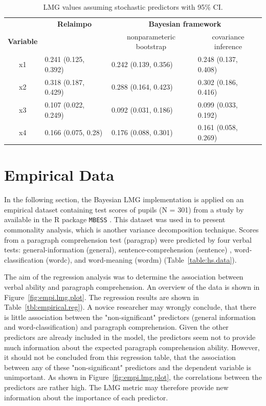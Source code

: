 \documentclass[11pt,a4paper,twoside]{book}
\begin{document}
\begin{table}[h]
\caption{LMG values assuming stochastic predictors with 95\% CI.}
\centering
\begin{tabular}{clll}
   \toprule
  & \multicolumn{1}{c}{\textbf{Relaimpo}} & \multicolumn{2}{c}{\textbf{Bayesian framework}} \\ \cmidrule(r){2-2}\cmidrule(l){3-4}
 \textbf{Variable} &  & \multicolumn{1}{c}{nonparameteric bootstrap}& \multicolumn{1}{c}{covariance inference} \\
 \midrule
x1 & 0.241 (0.125, 0.392)  & 0.242 (0.139, 0.356) &  0.248 (0.137, 0.408) \\ 
x2 & 0.318 (0.187, 0.429)  & 0.288 (0.164, 0.423)  & 0.302 (0.186, 0.416) \\ 
x3 & 0.107 (0.022, 0.249)  & 0.092 (0.031, 0.186)  & 0.099 (0.033, 0.192) \\ 
x4 & 0.166 (0.075, 0.28) & 0.176 (0.088, 0.301) & 0.161 (0.058, 0.269) \\ 
   \bottomrule
\end{tabular}
\label{tbl:nonstochEx1relaimpstoch}
\end{table}







\clearpage

\section{Empirical Data}
In the following section, the Bayesian LMG implementation is applied on an empirical dataset containing test scores of pupils (N = 301) from a study by \cite{Holzinger1939} available in the R package \texttt{MBESS} \citep{MBESS}. This dataset was used in \cite{Nimon2008} to present commonality analysis, which is another variance decomposition technique. Scores from a paragraph comprehension test (paragrap) were predicted by four verbal tests:  general-information (general),  sentence-comprehension (sentence) ,  word-classification (wordc), and  word-meaning (wordm) (Table~\ref{table:hs.data}). 

The aim of the regression analysis was to determine the  association between verbal ability and paragraph comprehension.  
An overview of the data is shown in Figure~\ref{fig:empi.lmg.plot}. The regression results are shown in Table~\ref{tbl:empirical.reg}). A novice researcher may wrongly conclude, that there is little association between the "non-significant" predictors (general information and word-classification) and paragraph comprehension. Given the other predictors are already included in the model, the predictors seem not to provide  much information about the expected paragraph comprehension ability. However, it should not be concluded from this regression table, that the association between any of these "non-significant" predictors and the dependent variable is unimportant. As shown in Figure~\ref{fig:empi.lmg.plot}, the correlations between the predictors are rather high. The LMG metric may therefore provide new information about the importance of each predictor. 
\end{document}
